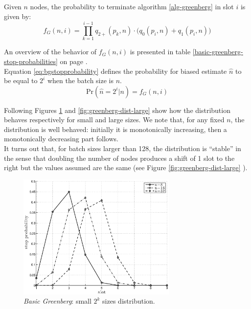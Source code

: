 \documentclass[11pt,a4paper,twoside,openright]{book}
\newcommand{\fg}{f_{G}}
\begin{document}
Given $n$ nodes, the probability to terminate algorithm \ref{alg-greenberg} in slot $i$ is given by:
\begin{equation}
\fg(n,i)=\prod_{k=1}^{i-1}q_{2+}(p_{k},n) \cdot \bigl( q_{0}(p_{i},n)+q_{1}(p_{i},n)\bigr)  
\label{eq:bgstopprobability}
\end{equation}

An overview of the behavior of $\fg(n,i)$ is presented in table \ref{basic-greenberg-stop-probabilities} on page \pageref{basic-greenberg-stop-probabilities}.\\ Equation \eqref{eq:bgstopprobability} defines the probability for biased estimate $\hat{n}$ to be equal to $2^{i}$ when the batch size is $n$. 
\begin{equation}
\textrm{Pr}\left( \hat{n}=2^{i}|n\right)=\fg(n,i)  
\end{equation}

Following Figures \ref{fig:greenberg-dist-small} and \ref{fig:greenberg-dist-large} show how the distribution behaves respectively for small and large sizes.
We note that, for any fixed $n$, the distribution is well behaved: initially it is monotonically increasing, then a monotonically decreasing part follows.\\
It turns out that, for batch sizes larger than 128, the distribution is ``stable'' in the sense that doubling the number of nodes produces a shift of 1 slot to the right but the values assumed are the same (see Figure \ref{fig:greenberg-dist-large} ).\\


\begin{figure}[htbp]
\begin{center}
\includegraphics[width=0.7\textwidth]{matlab/Greenberg_stop_prob/greenberg-stop-distribution-uniformity-init}
\caption{\emph{Basic Greenberg}:  small $2^{k}$ sizes distribution.}
\label{fig:greenberg-dist-small}
\end{center}
\end{figure}
\end{document}
